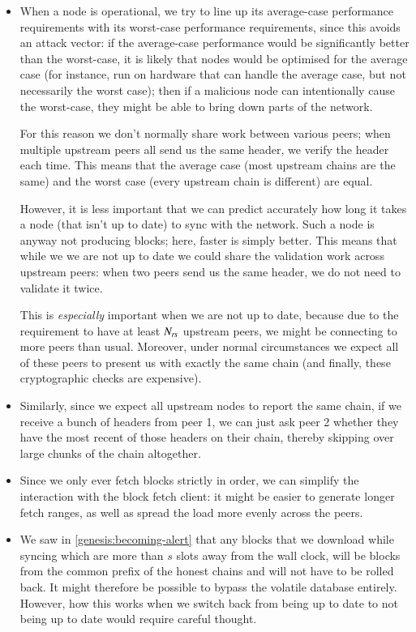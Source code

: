 \begin{itemize}

\item When a node is operational, we try to line up its average-case performance
requirements with its worst-case performance requirements, since this avoids
an attack vector: if the average-case performance would be significantly better
than the worst-case, it is likely that nodes would be optimised for the average
case (for instance, run on hardware that can handle the average case, but not
necessarily the worst case); then if a malicious node can intentionally cause
the worst-case, they might be able to bring down parts of the network.

For this reason we don't normally share work between various peers; when
multiple upstream peers all send us the same header, we verify the header
each time. This means that the average case (most upstream chains are the same)
and the worst case (every upstream chain is different) are equal.

\pagebreak

However, it is less important that we can predict accurately how long it takes
a node (that isn't up to date) to sync with the network. Such a node is anyway
not producing blocks; here, faster is simply better. This means that while we
we are not up to date  we could share the validation work across upstream peers:
when two peers send us the same header, we do not need to validate it twice.

This is \emph{especially} important when we are not up to date, because due to
the requirement to have at least $N_\mathit{rs}$ upstream peers, we might be
connecting to more peers than usual. Moreover, under normal circumstances we
expect all of these peers to present us with exactly the same chain (and
finally, these cryptographic checks are expensive).

\item Similarly, since we expect all upstream nodes to report the same chain,
if we receive a bunch of headers from peer 1, we can just ask peer 2
whether they have the most recent of those headers on their chain, thereby
skipping over large chunks of the chain altogether.

\item Since we only ever fetch blocks strictly in order, we can simplify
the interaction with the block fetch client: it might be easier to generate
longer fetch ranges, as well as spread the load more evenly across the peers.

\item We saw in \cref{genesis:becoming-alert} that any blocks that we download
while syncing which are more than $s$ slots away from the wall clock, will be
blocks from the common prefix of the honest chains and will not have to be
rolled back. It might therefore be possible to bypass the volatile database
entirely. However, how this works when we switch back from being up to date
to not being up to date would require careful thought.

\end{itemize}
